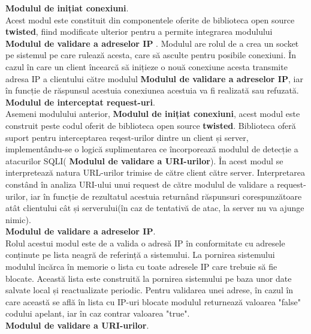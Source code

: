 \textbf{Modulul de inițiat conexiuni}.\\

Acest modul este constituit din componentele oferite de biblioteca open source \textbf{twisted}, fiind modificate ulterior pentru a permite integrarea modulului \textbf{Modulul de validare a adreselor IP} . Modulul are rolul de a crea un socket pe sistemul pe care rulează acesta, care să asculte pentru posibile conexiuni. În cazul în care un client încearcă să inițieze o nouă conexiune acesta transmite adresa IP a clientului către modulul \textbf{Modulul de validare a adreselor IP}, iar în funcție de răspunsul acestuia conexiunea acestuia va fi realizată sau refuzată. \\ 


 \textbf{Modulul de interceptat request-uri}.\\
 
Asemeni modulului anterior, \textbf{Modulul de inițiat conexiuni}, acest modul este construit peste codul oferit de biblioteca open source \textbf{twisted}. Biblioteca oferă suport pentru interceptarea reqest-urilor dintre un client și server, implementându-se o logică suplimentarea ce încorporează modulul de detecție a atacurilor SQLI( \textbf{Modulul de validare a URI-urilor}). În acest modul se interpretează natura URL-urilor trimise de către client către server.
Interpretarea constând în analiza URI-ului unui request de către modulul de validare a request-urilor, iar în funcție de rezultatul acestuia returnând răspunsuri corespunzătoare atât clientului cât și serverului(în caz de tentativă de atac, la server nu va ajunge nimic).  \\
 
	\textbf{Modulul de validare a adreselor IP}. \\

Rolul acestui modul este de  a valida o adresă IP în conformitate cu adresele conținute pe lista neagră de referință a sistemului. La pornirea sistemului modulul încărca în memorie o lista cu toate adresele IP care trebuie să fie blocate. Această lista este construită la pornirea sistemului pe baza unor date salvate local și reactualizate periodic. Pentru validarea unei adrese, în cazul în care această se află în lista cu IP-uri blocate modulul returnează valoarea "false" codului apelant, iar în caz contrar valoarea "true".  \\

 \textbf{Modulul de validare a URI-urilor}. \\
  
